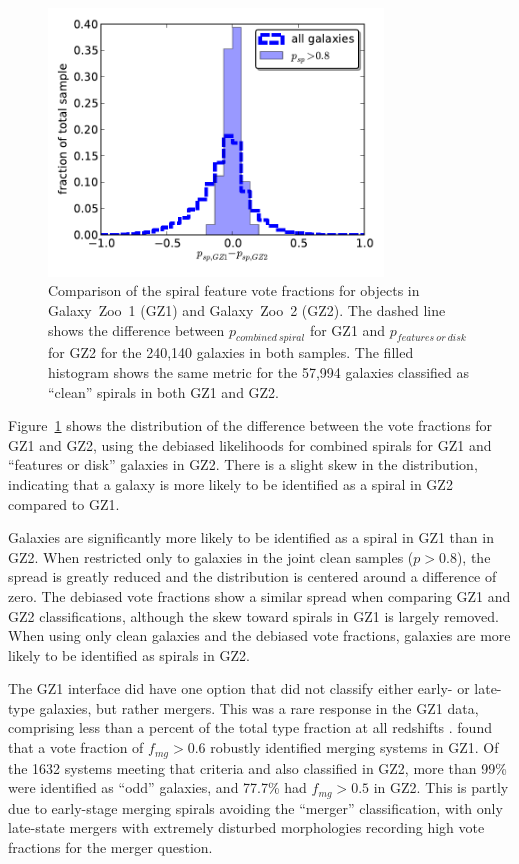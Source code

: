 \documentclass[useAMS,usenatbib]{mn2e}
\begin{document}
\begin{figure}
\includegraphics[angle=0,width=3.5in]{figures/gz1_gz2.pdf}
\caption{Comparison of the spiral feature vote fractions for objects in Galaxy~Zoo~1 (GZ1) and Galaxy~Zoo~2 (GZ2). The dashed line shows the difference between $p_{combined~spiral}$ for GZ1 and $p_{features~or~disk}$ for GZ2 for the 240,140 galaxies in both samples. The filled histogram shows the same metric for the 57,994 galaxies classified as ``clean'' spirals in both GZ1 and GZ2. 
\label{fig-gz1_gz2}}
\end{figure}

Figure~\ref{fig-gz1_gz2} shows the distribution of the difference between the vote fractions for GZ1 and GZ2, using the debiased likelihoods for combined spirals for GZ1 and ``features or disk'' galaxies in GZ2. There is a slight skew in the distribution, indicating that a galaxy is more likely to be identified as a spiral in GZ2 compared to GZ1. 

Galaxies are significantly more likely to be identified as a spiral in GZ1 than in GZ2. When restricted only to galaxies in the joint clean samples ($p>0.8$), the spread is greatly reduced and the distribution is centered around a difference of zero. The debiased vote fractions show a similar spread when comparing GZ1 and GZ2 classifications, although the skew toward spirals in GZ1 is largely removed. When using only clean galaxies and the debiased vote fractions, galaxies are more likely to be identified as spirals in GZ2. 

The GZ1 interface did have one option that did not classify either early- or late-type galaxies, but rather mergers. This was a rare response in the GZ1 data, comprising less than a percent of the total type fraction at all redshifts \citep{bam09}. \citet{dar10a} found that a vote fraction of $f_{mg} > 0.6$ robustly identified merging systems in GZ1. Of the 1632 systems meeting that criteria and also classified in GZ2, more than 99\% were identified as ``odd'' galaxies, and 77.7\% had $f_{mg}>0.5$ in GZ2. This is partly due to early-stage merging spirals avoiding the ``merger'' classification, with only late-state mergers with extremely disturbed morphologies recording high vote fractions for the merger question. 
\end{document}
